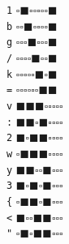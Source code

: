 \documentclass[a4paper]{article}
\begin{document}
\verb|1| $\square\blacksquare\square\square$\hspace{2cm}$\square\square\square\blacksquare$\\
\verb|b| $\square\square\blacksquare\square$\hspace{2cm}$\square\square\square\blacksquare$\\
\verb|g| $\square\square\square\blacksquare$\hspace{2cm}$\square\square\square\blacksquare$\\
\verb|/| $\square\square\square\square$\hspace{2cm}$\blacksquare\square\square\blacksquare$\\
\verb|k| $\square\square\square\square$\hspace{2cm}$\square\blacksquare\square\blacksquare$\\
\verb|=| $\square\square\square\square$\hspace{2cm}$\square\square\blacksquare\blacksquare$\\
\verb|v| $\blacksquare\blacksquare\blacksquare\square$\hspace{2cm}$\square\square\square\square$\\
\verb|:| $\blacksquare\blacksquare\square\blacksquare$\hspace{2cm}$\square\square\square\square$\\
\verb|2| $\blacksquare\square\blacksquare\blacksquare$\hspace{2cm}$\square\square\square\square$\\
\verb|w| $\square\blacksquare\blacksquare\blacksquare$\hspace{2cm}$\square\square\square\square$\\
\verb|y| $\blacksquare\blacksquare\square\square$\hspace{2cm}$\blacksquare\square\square\square$\\
\verb|3| $\blacksquare\square\blacksquare\square$\hspace{2cm}$\blacksquare\square\square\square$\\
\verb|{| $\square\blacksquare\blacksquare\square$\hspace{2cm}$\blacksquare\square\square\square$\\
\verb|<| $\blacksquare\square\square\blacksquare$\hspace{2cm}$\blacksquare\square\square\square$\\
\verb|"| $\square\blacksquare\square\blacksquare$\hspace{2cm}$\blacksquare\square\square\square$\\
\end{document}
